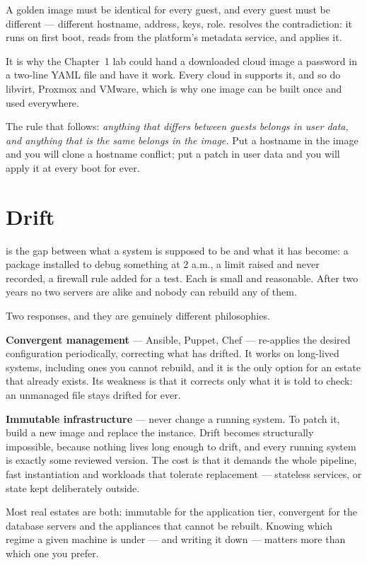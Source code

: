 \begin{conceptbox}
A golden image must be identical for every guest, and every guest must be
different --- different hostname, address, keys, role. 
resolves the contradiction: it runs on first boot, reads  from
the platform's metadata service, and applies it.

\smallskip
It is why the Chapter~1 lab could hand a downloaded cloud image a password in
a two-line YAML file and have it work. Every cloud in  supports it,
and so do libvirt, Proxmox and VMware, which is why one image can be built once
and used everywhere.

\smallskip
The rule that follows: \emph{anything that differs between guests belongs in
user data, and anything that is the same belongs in the image.} Put a hostname
in the image and you will clone a hostname conflict; put a patch in user data
and you will apply it at every boot for ever.
\end{conceptbox}

\section{Drift}

 is the gap between what a system is supposed to be
and what it has become: a package installed to debug something at 2 a.m., a
limit raised and never recorded, a firewall rule added for a test. Each is
small and reasonable. After two years no two servers are alike and nobody can
rebuild any of them.

Two responses, and they are genuinely different philosophies.

\begin{conceptbox}
\textbf{Convergent management} --- Ansible, Puppet, Chef --- re-applies the
desired configuration periodically, correcting what has drifted. It works on
long-lived systems, including ones you cannot rebuild, and it is the only
option for an estate that already exists. Its weakness is that it corrects only
what it is told to check: an unmanaged file stays drifted for ever.

\smallskip
\textbf{Immutable infrastructure} --- never change a running system. To patch
it, build a new image and replace the instance. Drift becomes structurally
impossible, because nothing lives long enough to drift, and every running
system is exactly some reviewed version. The cost is that it demands the whole
pipeline, fast instantiation and workloads that tolerate replacement ---
stateless services, or state kept deliberately outside.

\smallskip
Most real estates are both: immutable for the application tier, convergent for
the database servers and the appliances that cannot be rebuilt. Knowing which
regime a given machine is under --- and writing it down --- matters more than
which one you prefer.
\end{conceptbox}

